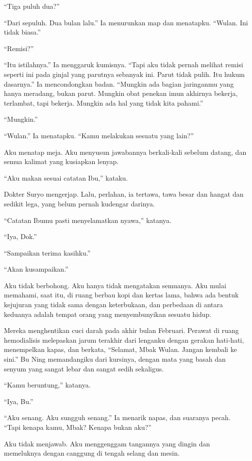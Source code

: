 \documentclass[11pt,twoside,openany]{book}
\begin{document}
``Tiga puluh dua?''

``Dari sepuluh. Dua bulan lalu.'' Ia menurunkan map dan menatapku. ``Wulan. Ini tidak biasa.''

``Remisi?''

``Itu istilahnya.'' Ia menggaruk kumisnya. ``Tapi aku tidak pernah melihat remisi seperti ini pada ginjal yang parutnya sebanyak ini. Parut tidak pulih. Itu hukum dasarnya.'' Ia mencondongkan badan. ``Mungkin ada bagian jaringanmu yang hanya meradang, bukan parut. Mungkin obat penekan imun akhirnya bekerja, terlambat, tapi bekerja. Mungkin ada hal yang tidak kita pahami.''

``Mungkin.''

``Wulan.'' Ia menatapku. ``Kamu melakukan sesuatu yang lain?''

Aku menatap meja. Aku menyusun jawabannya berkali-kali sebelum datang, dan semua kalimat yang kusiapkan lenyap.

``Aku makan sesuai catatan Ibu,'' kataku.

Dokter Suryo mengerjap. Lalu, perlahan, ia tertawa, tawa besar dan hangat dan sedikit lega, yang belum pernah kudengar darinya.

``Catatan Ibumu pasti menyelamatkan nyawa,'' katanya.

``Iya, Dok.''

``Sampaikan terima kasihku.''

``Akan kusampaikan.''

Aku tidak berbohong. Aku hanya tidak mengatakan semuanya. Aku mulai memahami, saat itu, di ruang berbau kopi dan kertas lama, bahwa ada bentuk kejujuran yang tidak sama dengan keterbukaan, dan perbedaan di antara keduanya adalah tempat orang yang menyembunyikan sesuatu hidup.

Mereka menghentikan cuci darah pada akhir bulan Februari. Perawat di ruang hemodialisis melepaskan jarum terakhir dari lenganku dengan gerakan hati-hati, menempelkan kapas, dan berkata, ``Selamat, Mbak Wulan. Jangan kembali ke sini.'' Bu Ning memandangiku dari kursinya, dengan mata yang basah dan senyum yang sangat lebar dan sangat sedih sekaligus.

``Kamu beruntung,'' katanya.

``Iya, Bu.''

``Aku senang. Aku sungguh senang.'' Ia menarik napas, dan suaranya pecah. ``Tapi kenapa kamu, Mbak? Kenapa bukan aku?''

Aku tidak menjawab. Aku menggenggam tangannya yang dingin dan memeluknya dengan canggung di tengah selang dan mesin.
\end{document}
